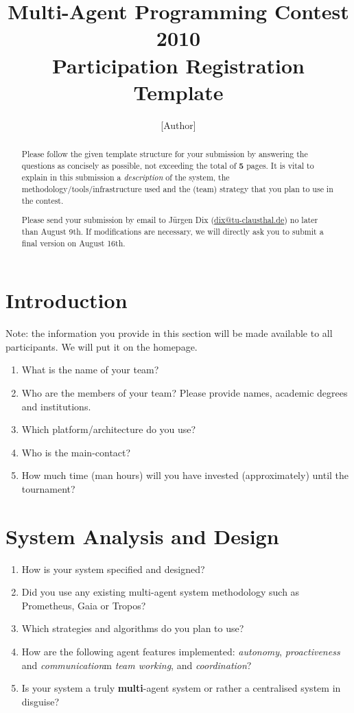 \documentclass{llncs}
\begin{document}
\title{Multi-Agent Programming Contest 2010\\Participation Registration Template}
\author{[Author]}
\institute{[Institute]}
 \maketitle
\begin{abstract}
Please follow the given template structure for your submission by
answering the questions as concisely as possible, not exceeding the
total of \textbf{5} pages. It is vital to explain in this submission
a \textit{description} of the 
system, the methodology/tools/infrastructure used
and the (team) strategy
that
you plan to use in the contest.

Please send your submission by email to J\"urgen Dix 
(\url{dix@tu-clausthal.de}) no later
than August 9th. If modifications are necessary,
we will directly ask you to submit a final version on August 16th.
\end{abstract}


\section{Introduction}

Note: the information you provide in this section will be made available
to all participants. We will put it on the homepage.

\begin{enumerate}
\item What is the name of your team?
\item Who are the members of your team? Please provide names,
academic degrees and institutions.
\item Which platform/architecture do you use?
\item Who is the main-contact?
\item How much time (man hours) will you have invested (approximately) until the tournament?
\end{enumerate}

\section{System Analysis and Design}

\begin{enumerate}
  \item How is your system  specified and designed?
  \item Did you use any existing multi-agent system
  methodology such as Prometheus, Gaia or Tropos?
  \item Which strategies and algorithms do you plan to use?
  \item How are the following agent features implemented:
  \emph{autonomy}, \emph{proactiveness}
  and \emph{communication}m \emph{team working}, and \emph{coordination}?
  \item Is your system a truly \textbf{multi}-agent system or
  rather a centralised system in disguise?
\end{enumerate}
\end{document}
